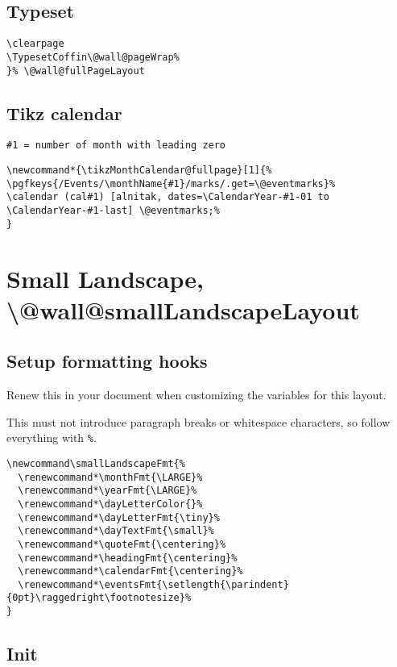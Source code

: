 \documentclass[11pt,oneside]{memoir-article}
\begin{document}
\subsection{Typeset}
\label{sec-10-4-6}

\begin{verbatim}
\clearpage
\TypesetCoffin\@wall@pageWrap%
}% \@wall@fullPageLayout
\end{verbatim}

\subsection{Tikz calendar}
\label{sec-10-4-7}

\begin{verbatim}
#1 = number of month with leading zero
\end{verbatim}

\begin{verbatim}
\newcommand*{\tikzMonthCalendar@fullpage}[1]{%
\pgfkeys{/Events/\monthName{#1}/marks/.get=\@eventmarks}%
\calendar (cal#1) [alnitak, dates=\CalendarYear-#1-01 to \CalendarYear-#1-last] \@eventmarks;%
}
\end{verbatim}

\section{Small Landscape, \textbackslash @wall@smallLandscapeLayout}
\label{sec-10-5}
\subsection{Setup formatting hooks}
\label{sec-10-5-1}

Renew this in your document when customizing the variables for this layout.

This must not introduce paragraph breaks or whitespace characters, so follow
everything with \texttt{\%}.

\begin{verbatim}
\newcommand\smallLandscapeFmt{%
  \renewcommand*\monthFmt{\LARGE}%
  \renewcommand*\yearFmt{\LARGE}%
  \renewcommand*\dayLetterColor{}%
  \renewcommand*\dayLetterFmt{\tiny}%
  \renewcommand*\dayTextFmt{\small}%
  \renewcommand*\quoteFmt{\centering}%
  \renewcommand*\headingFmt{\centering}%
  \renewcommand*\calendarFmt{\centering}%
  \renewcommand*\eventsFmt{\setlength{\parindent}{0pt}\raggedright\footnotesize}%
}
\end{verbatim}

\subsection{Init}
\label{sec-10-5-2}
\end{document}
